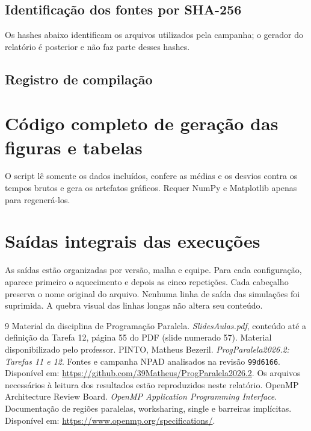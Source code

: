 \documentclass[12pt,a4paper]{article}
\begin{document}
\subsection{Identificação dos fontes por SHA-256}
Os hashes abaixo identificam os arquivos utilizados pela campanha; o gerador do relatório é posterior e não faz parte desses hashes.

\subsection{Registro de compilação}


\clearpage\section{Código completo de geração das figuras e tabelas}
O script lê somente os dados incluídos, confere as médias e os desvios contra os tempos brutos e gera os artefatos gráficos. Requer NumPy e Matplotlib apenas para regenerá-los.


\clearpage\section{Saídas integrais das execuções}
As saídas estão organizadas por versão, malha e equipe. Para cada configuração, aparece primeiro o aquecimento e depois as cinco repetições. Cada cabeçalho preserva o nome original do arquivo. Nenhuma linha de saída das simulações foi suprimida. A quebra visual das linhas longas não altera seu conteúdo.


\clearpage
\begin{thebibliography}{9}
 Material da disciplina de Programação Paralela. \textit{SlidesAulas.pdf}, conteúdo até a definição da Tarefa 12, página 55 do PDF (slide numerado 57). Material disponibilizado pelo professor.
 PINTO, Matheus Bezeril. \textit{ProgParalela2026.2: Tarefas 11 e 12}. Fontes e campanha NPAD analisados na revisão \texttt{99d6166}. Disponível em: \url{https://github.com/39Matheus/ProgParalela2026.2}. Os arquivos necessários à leitura dos resultados estão reproduzidos neste relatório.
 OpenMP Architecture Review Board. \textit{OpenMP Application Programming Interface}. Documentação de regiões paralelas, worksharing, single e barreiras implícitas. Disponível em: \url{https://www.openmp.org/specifications/}.
\end{thebibliography}
\end{document}
